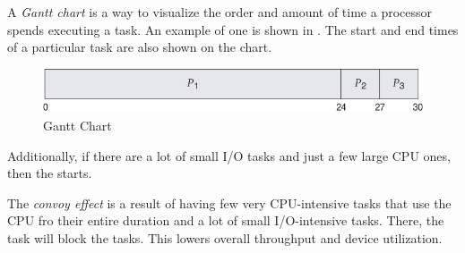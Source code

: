 \begin{definition}\label{def:Gantt_Chart}
  A \emph{Gantt chart} is a way to visualize the order and amount of time a processor spends executing a task.
  An example of one is shown in .
  The start and end times of a particular task are also shown on the chart.
\end{definition}

\begin{figure}[h!tbp]
  \centering
  \includegraphics[scale=0.8]{./Drawings/EDAF35-Operating_Systems/Gantt_Chart.jpg}
  \caption{Gantt Chart}
  \label{fig:Gantt_Chart}
\end{figure}

Additionally, if there are a lot of small I/O tasks and just a few large CPU ones, then the  starts.

\begin{definition}\label{def:Convoy_Effect}
  The \emph{convoy effect} is a result of having few very CPU-intensive tasks that use the CPU fro their entire duration and a lot of small I/O-intensive tasks.
  There, the  task will block the  tasks.
  This lowers overall throughput and device utilization.
\end{definition}

